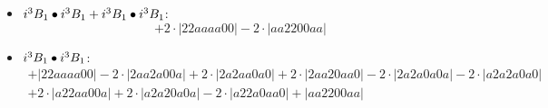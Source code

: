 \documentclass{article}
\begin{document}
\begin{itemize}
$$\begin{array}{c}
\end{array}$$
\item \boldmath$i^3 B_{1} \bullet i^3 B_{1} + i^3 B_{1} \bullet i^3 B_{1} \displaystyle $\unboldmath : \quad$$+2 \cdot \left|22aaaa00\right| -2 \cdot \left|aa2200aa\right|$$
\item \boldmath$i^3 B_{1} \bullet i^3 B_{1} \displaystyle $\unboldmath : \quad$$\begin{array}{c}
+\left|22aaaa00\right| -2 \cdot \left|2aa2a00a\right| +2 \cdot \left|2a2aa0a0\right| +2 \cdot \left|2aa20aa0\right| -2 \cdot \left|2a2a0a0a\right| -2 \cdot \left|a2a2a0a0\right| \\[0.5cm] +2 \cdot \left|a22aa00a\right| +2 \cdot \left|a2a20a0a\right| -2 \cdot \left|a22a0aa0\right| +\left|aa2200aa\right|
\end{array}$$

\end{itemize}
\end{document}
